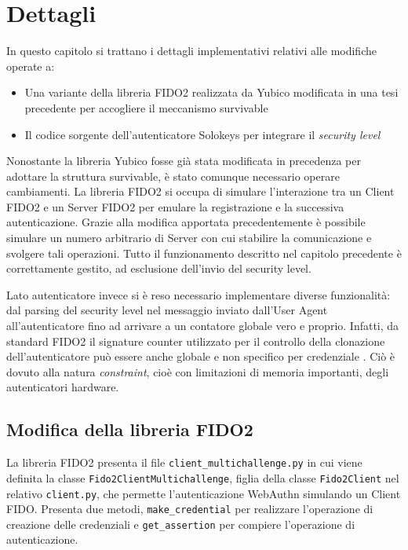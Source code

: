 \chapter{Dettagli}
\label{dettagli}

In questo capitolo si trattano i dettagli implementativi relativi alle modifiche operate a:
\begin{itemize}
	\item Una variante della libreria FIDO2 realizzata da Yubico modificata in una tesi precedente per accogliere il meccanismo survivable \cite{yubico:fido}
	\item Il codice sorgente dell'autenticatore Solokeys \cite{solokeys:code} per integrare il \emph{security level}
\end{itemize}

Nonostante la libreria Yubico fosse già stata modificata in precedenza per adottare la struttura survivable, è stato comunque necessario operare cambiamenti. La libreria FIDO2 si occupa di simulare l'interazione tra un Client FIDO2 e un Server FIDO2 per emulare la registrazione e la successiva autenticazione. Grazie alla modifica apportata precedentemente è possibile simulare un numero arbitrario di Server con cui stabilire la comunicazione e svolgere tali operazioni. Tutto il funzionamento descritto nel capitolo precedente è correttamente gestito, ad esclusione dell'invio del security level.

Lato autenticatore invece si è reso necessario implementare diverse funzionalità: dal parsing del security level nel messaggio inviato dall'User Agent all'autenticatore fino ad arrivare a un contatore globale vero e proprio. Infatti, da standard FIDO2 il signature counter utilizzato per il controllo della clonazione dell'autenticatore può essere anche globale e non specifico per credenziale \cite{fido:signature_counter}. Ciò è dovuto alla natura \emph{constraint}, cioè con limitazioni di memoria importanti, degli autenticatori hardware.

\section{Modifica della libreria FIDO2}
\label{modifica_fido}

La libreria FIDO2 presenta il file \verb*|client_multichallenge.py| in cui viene definita la classe \verb*|Fido2ClientMultichallenge|, figlia della classe \verb*|Fido2Client| nel relativo \verb*|client.py|, che permette l'autenticazione WebAuthn simulando un Client FIDO. Presenta due metodi, \verb*|make_credential| per realizzare l'operazione di creazione delle credenziali e \verb*|get_assertion| per compiere l'operazione di autenticazione. 

